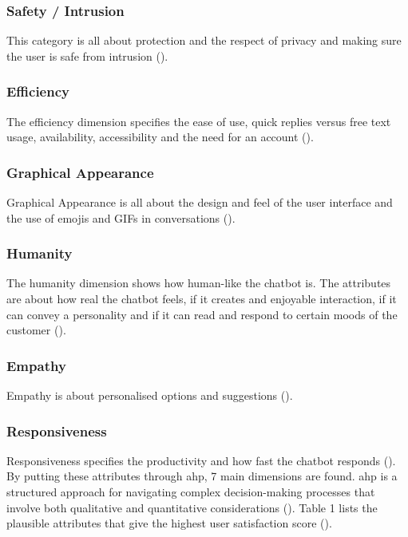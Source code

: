 \subsubsection{Safety / Intrusion}
This category is all about protection and the respect of privacy and making sure the user is safe from intrusion (\cite{Muizzah2021, Verkeyn2018}).\\

\subsubsection{Efficiency}
The efficiency dimension specifies the ease of use, quick replies versus free text usage, availability, accessibility and the need for an account (\cite{Muizzah2021, Verkeyn2018}).\\

\subsubsection{Graphical Appearance}
Graphical Appearance is all about the design and feel of the user interface and the use of emojis and GIFs in conversations (\cite{Muizzah2021, Verkeyn2018}).\\

\subsubsection{Humanity}
The humanity dimension shows how human-like the chatbot is. The attributes are about how real the chatbot feels, if it creates and enjoyable interaction, if it can convey a personality and if it can read and respond to certain moods of the customer (\cite{Muizzah2021, Verkeyn2018}).\\

\subsubsection{Empathy}
Empathy is about personalised options and suggestions (\cite{Muizzah2021, Verkeyn2018}).\\

\subsubsection{Responsiveness}
Responsiveness specifies the productivity and how fast the chatbot responds (\cite{Muizzah2021, Verkeyn2018}).\\
\break
By putting these attributes through \acrfull{ahp}, 7 main dimensions are found. \acrshort{ahp} is a structured approach for navigating complex decision-making processes that involve both qualitative and quantitative considerations (\cite{Radziwil2021}). Table 1 lists the plausible attributes that give the highest user satisfaction score (\cite{Muizzah2021}).\\

